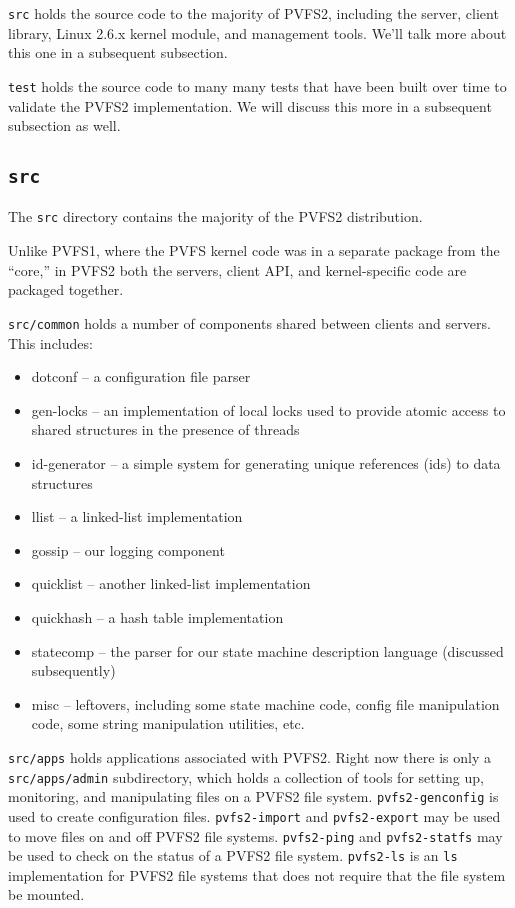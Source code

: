 \texttt{src} holds the source code to the majority of PVFS2, including the
server, client library, Linux 2.6.x kernel module, and management tools.
We'll talk more about this one in a subsequent subsection.

\texttt{test} holds the source code to many many tests that have been built
over time to validate the PVFS2 implementation.  We will discuss this more in
a subsequent subsection as well.

\subsection{\texttt{src}}

The \texttt{src} directory contains the majority of the PVFS2 distribution.

Unlike PVFS1, where the PVFS kernel code was in a separate package from the
``core,'' in PVFS2 both the servers, client API, and kernel-specific code are
packaged together.

\texttt{src/common} holds a number of components shared between clients and
servers.  This includes:
\begin{itemize}
\item dotconf -- a configuration file parser
\item gen-locks -- an implementation of local locks used to provide atomic
      access to shared structures in the presence of threads
\item id-generator -- a simple system for generating unique references (ids)
      to data structures
\item llist -- a linked-list implementation
\item gossip -- our logging component
\item quicklist -- another linked-list implementation
\item quickhash -- a hash table implementation
\item statecomp -- the parser for our state machine description language
      (discussed subsequently)
\item misc -- leftovers, including some state machine code, config file
      manipulation code, some string manipulation utilities, etc.
\end{itemize}

\texttt{src/apps} holds applications associated with PVFS2.  Right now there
is only a \texttt{src/apps/admin} subdirectory, which holds a collection of
tools for setting up, monitoring, and manipulating files on a PVFS2 file
system.  \texttt{pvfs2-genconfig} is used to create configuration files.
\texttt{pvfs2-import} and \texttt{pvfs2-export} may be used to move files on
and off PVFS2 file systems.  \texttt{pvfs2-ping} and \texttt{pvfs2-statfs} may
be used to check on the status of a PVFS2 file system.  \texttt{pvfs2-ls} is
an \texttt{ls} implementation for PVFS2 file systems that does not require
that the file system be mounted.


